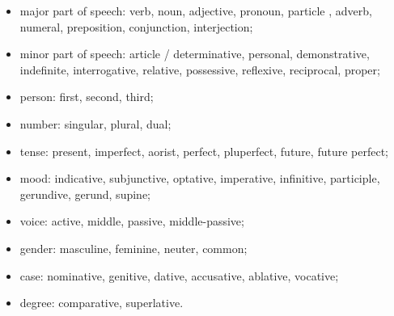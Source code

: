 \begin{itemize}
\item major part of speech: verb, noun, adjective, pronoun, particle
  , adverb, numeral, preposition, conjunction, interjection;
\item minor part of speech: article / determinative, personal,
  demonstrative, indefinite, interrogative, relative, possessive,
  reflexive, reciprocal, proper;
\item person: first, second, third;
\item number: singular, plural, dual;
\item tense: present, imperfect, aorist, perfect, pluperfect,
  future, future perfect;
\item mood: indicative, subjunctive, optative, imperative,
  infinitive, participle, gerundive, gerund, supine;
\item voice: active, middle, passive, middle-passive;
\item gender: masculine, feminine, neuter, common;
\item case: nominative, genitive, dative, accusative, ablative,
  vocative;
\item degree: comparative, superlative.
\end{itemize}

